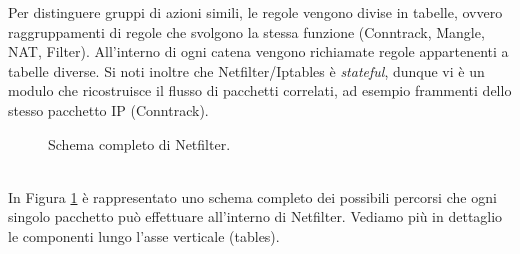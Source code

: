 Per distinguere gruppi di azioni simili, le regole vengono divise in tabelle, ovvero raggruppamenti di regole che svolgono la stessa funzione (Conntrack, Mangle, NAT, Filter). All'interno di ogni catena vengono richiamate regole appartenenti a tabelle diverse. Si noti inoltre che Netfilter/Iptables è \textit{stateful}, dunque vi è un modulo che ricostruisce il flusso di pacchetti correlati, ad esempio frammenti dello stesso pacchetto IP (Conntrack).
\begin{figure}[htbp]
	\caption{Schema completo di Netfilter.}
	\label{img:nfk-traversal}
\end{figure}\\
In Figura \ref{img:nfk-traversal} è rappresentato uno schema completo dei possibili percorsi che ogni singolo pacchetto può effettuare all'interno di Netfilter. Vediamo più in dettaglio le componenti lungo l'asse verticale (tables).

